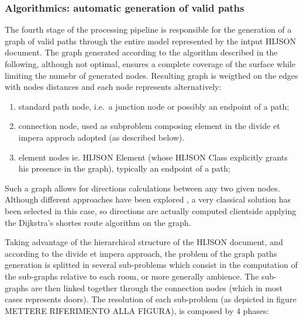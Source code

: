 \documentclass{sig-alternate}
\begin{document}
\subsubsection{Algorithmics: automatic generation of valid paths}\label{algorithmics-automatic-generation-of-valid-paths}

The fourth stage of the processing pipeline is responsible for the
generation of a graph of valid paths through the entire model
represented by the intput HIJSON document. The graph generated according
to the algorithm described in the following, although not optimal,
ensures a complete coverage of the surface while limiting the numebr of
generated nodes. Resulting graph is weigthed on the edges with nodes
distances and each node represents alternatively:

\begin{enumerate}
\def\labelenumi{\alph{enumi}.}
\itemsep1pt\parskip0pt
\item
  standard path node, i.e.~a junction node or possibly an endpoint of a
  path;
\item
  connection node, used as subproblem composing element in the divide et
  impera approch adopted (as described below).
\item
  element nodes ie. HIJSON Element (whose HIJSON Class explicitly grants
  his presence in the graph), typically an endpoint of a path;
\end{enumerate}

Such a graph allows for directions calculations between any two given
nodes. Although different approaches have been explored \cite{6999103}, 
a very classical solution has been selected in this case, so directions 
are actually computed clientside applying the Dijkstra's shortes route 
algorithm on the graph. 

Taking advantage of the hierarchical structure of the HIJSON document,
and according to the divide et impera approach, the problem of the graph
paths generation is splitted in several sub-problems which consist in
the computation of the sub-graphs relative to each room, or more
generally ambience. The sub-graphs are then linked together through the
connection nodes (which in most cases represents doors). The resolution
of each sub-problem (as depicted in figure METTERE RIFERIMENTO ALLA
FIGURA), is composed by 4 phases:
\end{document}
